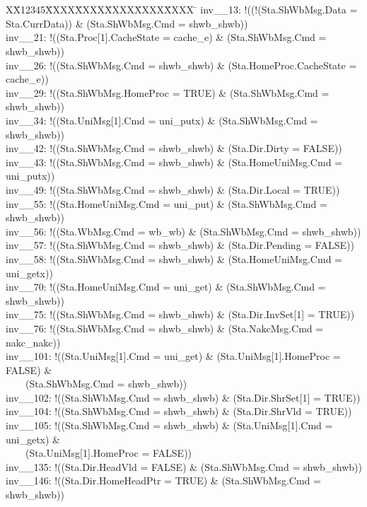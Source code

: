 \documentclass{llncs-new}
\newlength{\fminilength}
\newenvironment{fmini}[1][\linewidth]
  {\setlength{\fminilength}{#1\fboxsep-2\fboxrule}%
   \vspace{2ex}\noindent\begin{lrbox}{\fminibox}\begin{minipage}{\fminilength}%
   \mbox{ }\hfill\vspace{-2.5ex}}%
  {\end{minipage}\end{lrbox}\vspace{1ex}\hspace{0ex}%
   \framebox{\usebox{\fminibox}}}
\newenvironment{specification}
{\noindent\scriptsize
\tt\begin{fmini}\begin{tabbing}X\=X12345\=XXXX\=XXXX\=XXXX\=XXXX\=XXXX
\=\+\kill} {\end{tabbing}\normalfont\end{fmini}}
\begin{document}
\vspace{-5pt}
\begin{specification}
inv\_\_13: !((!(Sta.ShWbMsg.Data = Sta.CurrData)) \& (Sta.ShWbMsg.Cmd = shwb\_shwb))\\
inv\_\_21: !((Sta.Proc[1].CacheState = cache\_e) \& (Sta.ShWbMsg.Cmd = shwb\_shwb))\\
inv\_\_26: !((Sta.ShWbMsg.Cmd = shwb\_shwb) \& (Sta.HomeProc.CacheState = cache\_e))\\
inv\_\_29: !((Sta.ShWbMsg.HomeProc = TRUE) \& (Sta.ShWbMsg.Cmd = shwb\_shwb))\\
inv\_\_34: !((Sta.UniMsg[1].Cmd = uni\_putx) \& (Sta.ShWbMsg.Cmd = shwb\_shwb))\\
inv\_\_42: !((Sta.ShWbMsg.Cmd = shwb\_shwb) \& (Sta.Dir.Dirty = FALSE))\\
inv\_\_43: !((Sta.ShWbMsg.Cmd = shwb\_shwb) \& (Sta.HomeUniMsg.Cmd = uni\_putx))\\
inv\_\_49: !((Sta.ShWbMsg.Cmd = shwb\_shwb) \& (Sta.Dir.Local = TRUE))\\
inv\_\_55: !((Sta.HomeUniMsg.Cmd = uni\_put) \& (Sta.ShWbMsg.Cmd = shwb\_shwb))\\
inv\_\_56: !((Sta.WbMsg.Cmd = wb\_wb) \& (Sta.ShWbMsg.Cmd = shwb\_shwb))\\
inv\_\_57: !((Sta.ShWbMsg.Cmd = shwb\_shwb) \& (Sta.Dir.Pending = FALSE))\\
inv\_\_58: !((Sta.ShWbMsg.Cmd = shwb\_shwb) \& (Sta.HomeUniMsg.Cmd = uni\_getx))\\
inv\_\_70: !((Sta.HomeUniMsg.Cmd = uni\_get) \& (Sta.ShWbMsg.Cmd = shwb\_shwb))\\
inv\_\_75: !((Sta.ShWbMsg.Cmd = shwb\_shwb) \& (Sta.Dir.InvSet[1] = TRUE))\\
inv\_\_76: !((Sta.ShWbMsg.Cmd = shwb\_shwb) \& (Sta.NakcMsg.Cmd = nakc\_nakc))\\
inv\_\_101: !((Sta.UniMsg[1].Cmd = uni\_get) \& (Sta.UniMsg[1].HomeProc = FALSE) \&\\ ~~~~(Sta.ShWbMsg.Cmd = shwb\_shwb))\\
inv\_\_102: !((Sta.ShWbMsg.Cmd = shwb\_shwb) \& (Sta.Dir.ShrSet[1] = TRUE))\\
inv\_\_104: !((Sta.ShWbMsg.Cmd = shwb\_shwb) \& (Sta.Dir.ShrVld = TRUE))\\
inv\_\_105: !((Sta.ShWbMsg.Cmd = shwb\_shwb) \& (Sta.UniMsg[1].Cmd = uni\_getx) \&\\~~~~(Sta.UniMsg[1].HomeProc = FALSE))\\
inv\_\_135: !((Sta.Dir.HeadVld = FALSE) \& (Sta.ShWbMsg.Cmd = shwb\_shwb))\\
inv\_\_146: !((Sta.Dir.HomeHeadPtr = TRUE) \& (Sta.ShWbMsg.Cmd = shwb\_shwb))
\end{specification}
\end{document}
